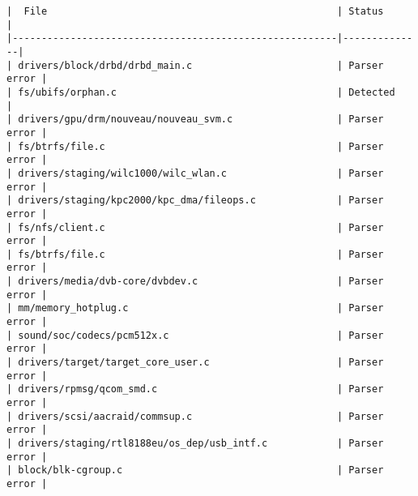 \begin{verbatim}
|  File                                                  | Status       | 
|--------------------------------------------------------|--------------|
| drivers/block/drbd/drbd_main.c                         | Parser error | 
| fs/ubifs/orphan.c                                      | Detected     | 
| drivers/gpu/drm/nouveau/nouveau_svm.c                  | Parser error | 
| fs/btrfs/file.c                                        | Parser error | 
| drivers/staging/wilc1000/wilc_wlan.c                   | Parser error | 
| drivers/staging/kpc2000/kpc_dma/fileops.c              | Parser error | 
| fs/nfs/client.c                                        | Parser error | 
| fs/btrfs/file.c                                        | Parser error | 
| drivers/media/dvb-core/dvbdev.c                        | Parser error | 
| mm/memory_hotplug.c                                    | Parser error | 
| sound/soc/codecs/pcm512x.c                             | Parser error | 
| drivers/target/target_core_user.c                      | Parser error | 
| drivers/rpmsg/qcom_smd.c                               | Parser error | 
| drivers/scsi/aacraid/commsup.c                         | Parser error | 
| drivers/staging/rtl8188eu/os_dep/usb_intf.c            | Parser error | 
| block/blk-cgroup.c                                     | Parser error | 
\end{verbatim}